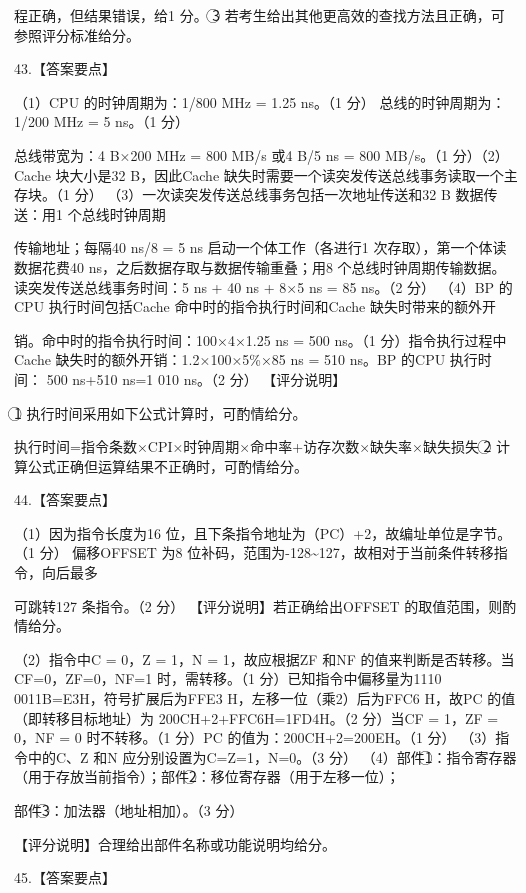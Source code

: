 \documentclass[UTF8,11pt]{ctexart}
\begin{document}
程正确，但结果错误，给1 分。 \textcircled{3} 若考生给出其他更高效的查找方法且正确，可参照评分标准给分。


43.【答案要点】


（1）CPU 的时钟周期为：1/800 MHz = 1.25 ns。（1 分） 总线的时钟周期为：1/200 MHz = 5 ns。（1 分）


总线带宽为：4 B×200 MHz = 800 MB/s 或4 B/5 ns = 800 MB/s。（1 分）（2）Cache 块大小是32 B，因此Cache 缺失时需要一个读突发传送总线事务读取一个主存块。（1 分） （3）一次读突发传送总线事务包括一次地址传送和32 B 数据传送：用1 个总线时钟周期


传输地址；每隔40 ns/8 = 5 ns 启动一个体工作（各进行1 次存取），第一个体读数据花费40 ns，之后数据存取与数据传输重叠；用8 个总线时钟周期传输数据。读突发传送总线事务时间：5 ns + 40 ns + 8×5 ns = 85 ns。（2 分） （4）BP 的CPU 执行时间包括Cache 命中时的指令执行时间和Cache 缺失时带来的额外开


销。命中时的指令执行时间：100×4×1.25 ns = 500 ns。（1 分）指令执行过程中 Cache 缺失时的额外开销：1.2×100×5\%×85 ns = 510 ns。BP 的CPU 执行时间： 500 ns+510 ns=1 010 ns。（2 分） 【评分说明】


\textcircled{1} 执行时间采用如下公式计算时，可酌情给分。


执行时间=指令条数×CPI×时钟周期×命中率+访存次数×缺失率×缺失损失 \textcircled{2} 计算公式正确但运算结果不正确时，可酌情给分。


44.【答案要点】


（1）因为指令长度为16 位，且下条指令地址为（PC）+2，故编址单位是字节。（1 分） 偏移OFFSET 为8 位补码，范围为-128\textasciitilde{}127，故相对于当前条件转移指令，向后最多


可跳转127 条指令。（2 分） 【评分说明】若正确给出OFFSET 的取值范围，则酌情给分。


（2）指令中C = 0，Z = 1，N = 1，故应根据ZF 和NF 的值来判断是否转移。当CF=0，ZF=0，NF=1 时，需转移。（1 分）已知指令中偏移量为1110 0011B=E3H，符号扩展后为FFE3 H，左移一位（乘2）后为FFC6 H，故PC 的值（即转移目标地址）为 200CH+2+FFC6H=1FD4H。（2 分）当CF = 1，ZF = 0，NF = 0 时不转移。（1 分）PC 的值为：200CH+2=200EH。（1 分） （3）指令中的C、Z 和N 应分别设置为C=Z=1，N=0。（3 分） （4）部件\textcircled{1}：指令寄存器（用于存放当前指令）；部件\textcircled{2}：移位寄存器（用于左移一位）；


部件\textcircled{3}：加法器（地址相加）。（3 分）


【评分说明】合理给出部件名称或功能说明均给分。


45.【答案要点】
\end{document}

